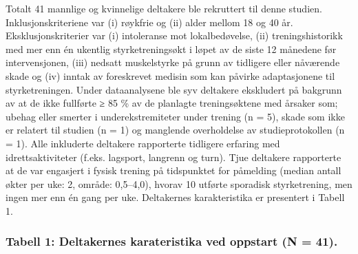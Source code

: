 \documentclass[
  letterpaper,
  DIV=11,
  numbers=noendperiod]{scrreprt}
\begin{document}
Totalt 41 mannlige og kvinnelige deltakere ble rekruttert til denne
studien. Inklusjonskriteriene var (i) røykfrie og (ii) alder mellom 18
og 40 år. Eksklusjonskriterier var (i) intoleranse mot lokalbedøvelse,
(ii) treningshistorikk med mer enn én ukentlig styrketreningsøkt i løpet
av de siste 12 månedene før intervensjonen, (iii) nedsatt muskelstyrke
på grunn av tidligere eller nåværende skade og (iv) inntak av
foreskrevet medisin som kan påvirke adaptasjonene til styrketreningen.
Under dataanalysene ble syv deltakere ekskludert på bakgrunn av at de
ikke fullførte ≥ 85 \% av de planlagte treningsøktene med årsaker som;
ubehag eller smerter i underekstremiteter under trening (n = 5), skade
som ikke er relatert til studien (n = 1) og manglende overholdelse av
studieprotokollen (n = 1). Alle inkluderte deltakere rapporterte
tidligere erfaring med idrettsaktiviteter (f.eks. lagsport, langrenn og
turn). Tjue deltakere rapporterte at de var engasjert i fysisk trening
på tidspunktet for påmelding (median antall økter per uke: 2, område:
0,5--4,0), hvorav 10 utførte sporadisk styrketrening, men ingen mer enn
én gang per uke. Deltakernes karakteristika er presentert i Tabell 1.

\hypertarget{tabell-1-deltakernes-karateristika-ved-oppstart-n-41.}{%
\subsubsection{Tabell 1: Deltakernes karateristika ved oppstart (N =
41).}\label{tabell-1-deltakernes-karateristika-ved-oppstart-n-41.}}
\end{document}
